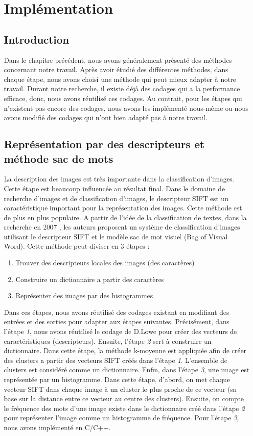 \chapter{Implémentation}
\label{chap:impl}

\section{Introduction}
Dans le chapitre précédent, nous avons généralement présenté des méthodes concernant notre travail. Après avoir étudié des différentes méthodes, dans chaque étape, nous avons choisi une méthode qui peut mieux adapter à notre travail. Durant notre recherche, il existe déjà des codages qui a la performance efficace, donc, nous avons réutilisé ces codages. Au contrait, pour les étapes qui n'existent pas encore des codages, nous avons les implémenté nous-même ou nous avons modifié des codages qui n'ont bien adapté pas à notre travail.

\section{Représentation par des descripteurs et méthode sac de mots}
La description des images est très importante dans la classification d'images. Cette étape est beaucoup influencée au résultat final. Dans le domaine de recherche d'images et de classification d'images, le descripteur SIFT \cite{low04} est un caractéristique important pour la représentation des images. Cette méthode est de plus en plus populaire. A partir de l'idée de la classification de textes, dans la recherche en 2007 \cite{bos07}, les auteurs proposent un système de classification d'images utilisant le descripteur SIFT et le modèle sac de mot visuel (Bag of Visual Word). Cette méthode peut diviser en 3 étapes :
\begin{enumerate}
\item Trouver des descripteurs locales des images (des caractères)
\item Construire un dictionnaire a partir des caractères
\item Représenter des images par des histogrammes
\end{enumerate}

Dans ces étapes, nous avons réutilisé des codages existant en modifiant des entrées et des sorties pour adapter aux étapes suivantes. Précisément, dans l'étape \textit{1}, nous avons réutilisé le codage de D.Lowe \cite{low99} pour créer des vecteurs de caractéristiques (descripteurs). Ensuite, l'étape \textit{2} sert à construire un dictionnaire. Dans cette étape, la méthode k-moyenne \cite{mq67} est appliquée afin de créer des clusters a partir des vecteurs SIFT créés dans l'étape \textit{1}. L'ensemble de clusters est considéré comme un dictionnaire. Enfin, dans l'étape \textit{3}, une image est représentée par un histogramme. Dans cette étape, d'abord, on met chaque vecteur SIFT dans chaque image à un cluster le plus proche de ce vecteur (sa base sur la distance entre ce vecteur au centre des clusters). Ensuite, on compte le fréquence des mots d'une image existe dans le dictionnaire créé dans l'étape \textit{2} pour représenter l'image comme un histogramme de fréquence. Pour l'étape \textit{3}, nous avons implémenté en C/C++.

